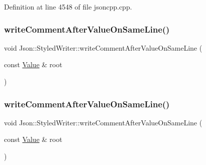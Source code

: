 Definition at line 4548 of file jsoncpp.\+cpp.

\hypertarget{class_json_1_1_styled_writer_ab12b274c62822fc51ec4617c6be95139}{}\label{class_json_1_1_styled_writer_ab12b274c62822fc51ec4617c6be95139} 
\subsubsection{\texorpdfstring{write\+Comment\+After\+Value\+On\+Same\+Line()}{writeCommentAfterValueOnSameLine()}\hspace{0.1cm}{\footnotesize\ttfamily [1/2]}}
{\footnotesize\ttfamily void Json\+::\+Styled\+Writer\+::write\+Comment\+After\+Value\+On\+Same\+Line (\begin{DoxyParamCaption}\item[{const \hyperlink{class_json_1_1_value}{Value} \&}]{root }\end{DoxyParamCaption})\hspace{0.3cm}{\ttfamily [private]}}

\hypertarget{class_json_1_1_styled_writer_ab12b274c62822fc51ec4617c6be95139}{}\label{class_json_1_1_styled_writer_ab12b274c62822fc51ec4617c6be95139} 
\subsubsection{\texorpdfstring{write\+Comment\+After\+Value\+On\+Same\+Line()}{writeCommentAfterValueOnSameLine()}\hspace{0.1cm}{\footnotesize\ttfamily [2/2]}}
{\footnotesize\ttfamily void Json\+::\+Styled\+Writer\+::write\+Comment\+After\+Value\+On\+Same\+Line (\begin{DoxyParamCaption}\item[{const \hyperlink{class_json_1_1_value}{Value} \&}]{root }\end{DoxyParamCaption})\hspace{0.3cm}{\ttfamily [private]}}



